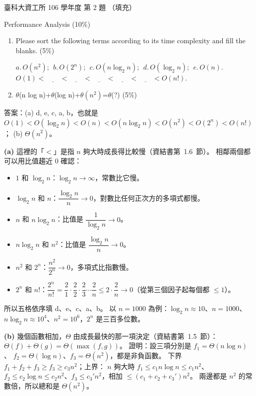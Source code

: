 \begin{pastexam}[label={px:ntust-106-ice-02}]{臺科大資工所 106 學年度 第 2 題}
（填充）

Performance Analysis (10\%)
\begin{enumerate}[label=(\alph*)]
\item Please sort the following terms according to its time complexity and fill the blanks. (5\%)
\begin{center}
$a.\,O(n^2);\ \ b.\,O(2^n);\ \ c.\,O(n\log_2 n);\ \ d.\,O(\log_2 n);\ \ e.\,O(n).$\\[2pt]
$O(1)<\underline{\hspace{2em}}<\underline{\hspace{2em}}<\underline{\hspace{2em}}<\underline{\hspace{2em}}
<\underline{\hspace{2em}}<O(n!).$
\end{center}
\item $\theta$(n log n)+$\theta$(log n)+$\theta(n^2)$=$\theta$(?) (5\%)
\end{enumerate}
\end{pastexam}

\begin{pastsoln}
答案：(a) d, e, c, a, b，也就是 $O(1) < O(\log_2 n) < O(n) < O(n\log_2 n) < O(n^2) < O(2^n) < O(n!)$；
(b) $\Theta(n^2)$。

\textbf{(a)} 這裡的「$<$」是指 $n$ 夠大時成長得比較慢（資結書第~1.6~節）。 相鄰兩個都可以用比值趨近 $0$
確認：
\begin{itemize}
\item $1$ 和 $\log_2 n$：$\log_2 n \to \infty$，常數比它慢。
\item $\log_2 n$ 和 $n$：$\dfrac{\log_2 n}{n} \to 0$，對數比任何正次方的多項式都慢。
\item $n$ 和 $n\log_2 n$：比值是 $\dfrac{1}{\log_2 n} \to 0$。
\item $n\log_2 n$ 和 $n^2$：比值是 $\dfrac{\log_2 n}{n} \to 0$。
\item $n^2$ 和 $2^n$：$\dfrac{n^2}{2^n} \to 0$，多項式比指數慢。
\item $2^n$ 和 $n!$：$\dfrac{2^n}{n!} = \dfrac{2}{1} \cdot \dfrac{2}{2} \cdot \dfrac{2}{3} \cdots \dfrac{2}{n}
\le 2 \cdot \dfrac{2}{n} \to 0$（從第三個因子起每個都 $\le 1$）。
\end{itemize}
所以五格依序填 d、e、c、a、b。 以 $n = 1000$ 為例：$\log_2 n \approx 10$、$n = 1000$、
$n\log_2 n \approx 10^4$、$n^2 = 10^6$，$2^n$ 是三百多位數。

\textbf{(b)} 幾個函數相加，$\Theta$ 由成長最快的那一項決定（資結書第~1.5~節）：
$\Theta(f) + \Theta(g) = \Theta(\max(f, g))$。 證明：設三項分別是 $f_1 = \Theta(n\log n)$、
$f_2 = \Theta(\log n)$、$f_3 = \Theta(n^2)$，都是非負函數。 下界 $f_1 + f_2 + f_3 \ge f_3 \ge c_3 n^2$；上界：
$n$ 夠大時 $f_1 \le c_1 n\log n \le c_1 n^2$、$f_2 \le c_2 \log n \le c_2 n^2$、$f_3 \le c_3' n^2$，相加
$\le (c_1 + c_2 + c_3')n^2$。 兩邊都是 $n^2$ 的常數倍，所以總和是 $\Theta(n^2)$。
\end{pastsoln}
